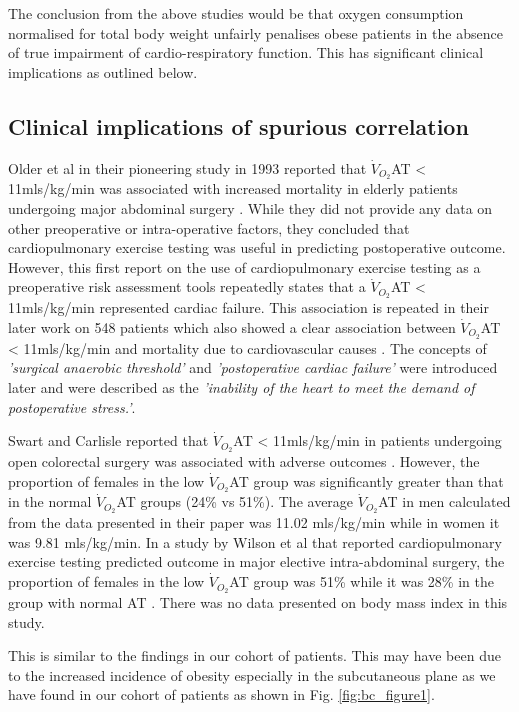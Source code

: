 The conclusion from the above studies would be that oxygen consumption normalised for total body weight unfairly penalises obese patients in the absence of true impairment of cardio-respiratory function. This has significant clinical implications as outlined below.

\subsection{Clinical implications of spurious correlation}
Older et al in their pioneering study in 1993 reported that $\dot{V}_{O_2}$AT < 11mls/kg/min was associated with increased mortality in elderly patients undergoing major abdominal surgery \parencite{older_preoperative_1993}. While they did not provide any data on other preoperative or intra-operative factors, they concluded that cardiopulmonary exercise testing was useful in predicting postoperative outcome. However, this first report on the use of cardiopulmonary exercise testing as a preoperative risk assessment tools repeatedly states that a $\dot{V}_{O_2}$AT < 11mls/kg/min represented cardiac failure. This association is repeated in their later work on 548 patients which also showed a clear association between $\dot{V}_{O_2}$AT < 11mls/kg/min and mortality due to cardiovascular causes \parencite{older_cardiopulmonary_1999}. The concepts of \textit{'surgical anaerobic threshold'} and \textit{'postoperative cardiac failure'} were introduced later and were described as the \textit{'inability of the heart to meet the demand of postoperative stress.'}\parencite{society_ats/accp_2003}.

Swart and Carlisle reported that $\dot{V}_{O_2}$AT < 11mls/kg/min in patients undergoing open colorectal surgery was associated with adverse outcomes \parencite{swart_case-controlled_2012}. However, the proportion of females in the low $\dot{V}_{O_2}$AT group was significantly greater than that in the normal $\dot{V}_{O_2}$AT groups (24\% vs 51\%). The average $\dot{V}_{O_2}$AT in men calculated from the data presented in their paper was 11.02 mls/kg/min while in women it was 9.81 mls/kg/min. In a study by Wilson et al that reported cardiopulmonary exercise testing predicted outcome in major elective intra-abdominal surgery, the proportion of females in the low $\dot{V}_{O_2}$AT group was 51\% while it was 28\% in the group with normal AT \parencite{wilson_impaired_2010}. There was no data presented on body mass index in this study.

This is similar to the findings in our cohort of patients. This may have been due to the increased incidence of obesity especially in the subcutaneous plane as we have found in our cohort of patients as shown in Fig. \ref{fig:bc_figure1}.

